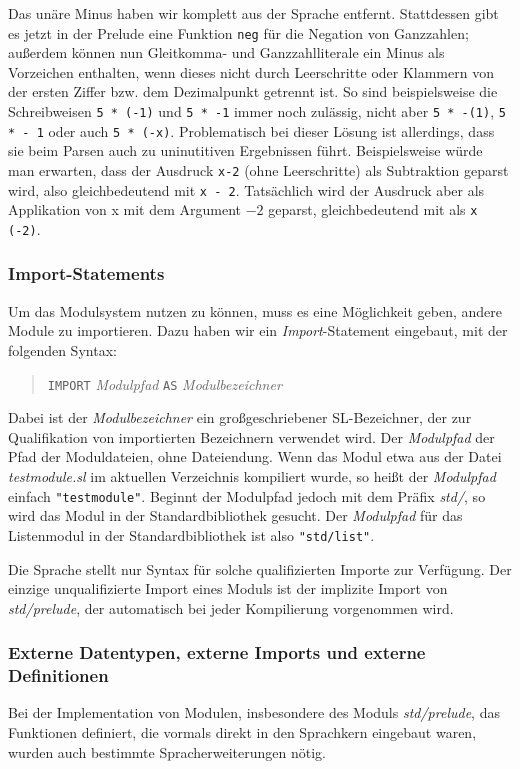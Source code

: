 \documentclass[runningheads]{llncs}
\begin{document}
Das unäre Minus haben wir komplett aus der Sprache entfernt.
Stattdessen gibt es jetzt in der Prelude eine Funktion \verb|neg| für
die Negation von Ganzzahlen; außerdem können nun Gleitkomma- und
Ganzzahlliterale ein Minus als Vorzeichen enthalten, wenn dieses nicht
durch Leerschritte oder Klammern von der ersten Ziffer bzw. dem
Dezimalpunkt getrennt ist.  So sind beispielsweise die Schreibweisen
\verb|5 * (-1)| und \verb|5 * -1| immer noch zulässig, nicht aber
\verb|5 * -(1)|, \verb|5 * - 1| oder auch \verb|5 * (-x)|.
Problematisch bei dieser Lösung ist allerdings, dass sie beim Parsen
auch zu uninutitiven Ergebnissen führt.  Beispielsweise würde man
erwarten, dass der Ausdruck \verb|x-2| (ohne Leerschritte) als
Subtraktion geparst wird, also gleichbedeutend mit \verb|x - 2|.
Tatsächlich wird der Ausdruck aber als Applikation von x mit dem
Argument $-2$ geparst, gleichbedeutend mit als \verb|x (-2)|.

\subsubsection{Import-Statements}

Um das Modulsystem nutzen zu können, muss es eine Möglichkeit geben,
andere Module zu importieren.  Dazu haben wir ein
\emph{Import}-Statement eingebaut, mit der folgenden Syntax:

\begin{quote}
\verb|IMPORT| \emph{Modulpfad} \verb|AS| \emph{Modulbezeichner}
\end{quote}

Dabei ist der \emph{Modulbezeichner} ein großgeschriebener
SL-Bezeichner, der zur Qualifikation von importierten Bezeichnern
verwendet wird.  Der \emph{Modulpfad} der Pfad der Moduldateien, ohne
Dateiendung.  Wenn das Modul etwa aus der Datei
\emph{testmodule.sl} im aktuellen Verzeichnis kompiliert wurde, so
heißt der \emph{Modulpfad} einfach \verb|"testmodule"|.  Beginnt der
Modulpfad jedoch mit dem Präfix \emph{std/}, so wird das Modul in der
Standardbibliothek gesucht.  Der \emph{Modulpfad} für das Listenmodul
in der Standardbibliothek ist also \verb|"std/list"|.

Die Sprache stellt nur Syntax für solche qualifizierten Importe zur
Verfügung.  Der einzige unqualifizierte Import eines Moduls ist der
implizite Import von \emph{std/prelude}, der automatisch bei jeder
Kompilierung vorgenommen wird.

\subsubsection{Externe Datentypen, externe Imports und externe
  Definitionen}
Bei der Implementation von Modulen, insbesondere des Moduls
\emph{std/prelude}, das Funktionen definiert, die vormals direkt in
den Sprachkern eingebaut waren, wurden auch bestimmte
Spracherweiterungen nötig.
\end{document}
